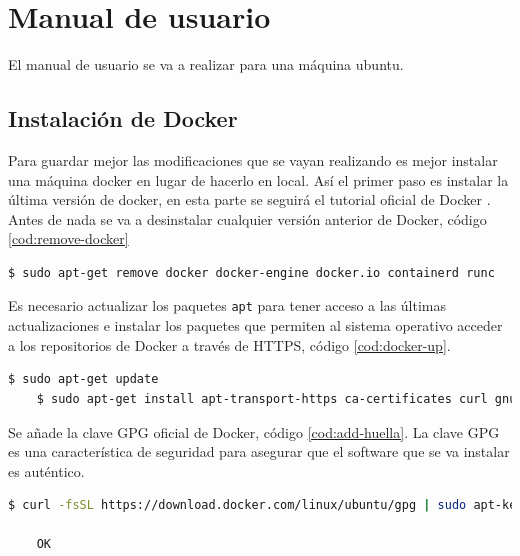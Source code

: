 \chapter{Manual de usuario}
\label{sec:manual}

El manual de usuario se va a realizar para una máquina ubuntu.\\

\section{Instalación de Docker}

Para guardar mejor las modificaciones que se vayan realizando es mejor instalar una máquina docker en lugar de hacerlo en local. Así el primer paso es instalar la última versión de docker, en esta parte se seguirá el tutorial oficial de Docker \cite{instalacion-docker}. Antes de nada se va a desinstalar cualquier versión anterior de Docker, código \ref{cod:remove-docker}\\

\begin{lstlisting}[language=Bash,caption=Instalación Docker. Parte I, label=cod:remove-docker, style=Consola]
	$ sudo apt-get remove docker docker-engine docker.io containerd runc
\end{lstlisting}


Es necesario actualizar los paquetes \texttt{apt} para tener acceso a las últimas actualizaciones e instalar los paquetes que permiten al sistema operativo acceder a los repositorios de Docker a través de HTTPS, código \ref{cod:docker-up}.\\

\begin{lstlisting}[language=Bash,caption=Instalación Docker. Parte II, label=cod:docker-up, style=Consola]
	$ sudo apt-get update
	$ sudo apt-get install apt-transport-https ca-certificates curl gnupg-agent software-properties-common
\end{lstlisting}

Se añade la clave GPG oficial de Docker, código \ref{cod:add-huella}. La clave GPG es una característica de seguridad para asegurar que el software que se va instalar es auténtico.\\
 
\begin{lstlisting}[language=Bash,caption=Instalación Docker. Parte III, label=cod:add-huella, style=Consola]
	$ curl -fsSL https://download.docker.com/linux/ubuntu/gpg | sudo apt-key add -

	OK
\end{lstlisting}

